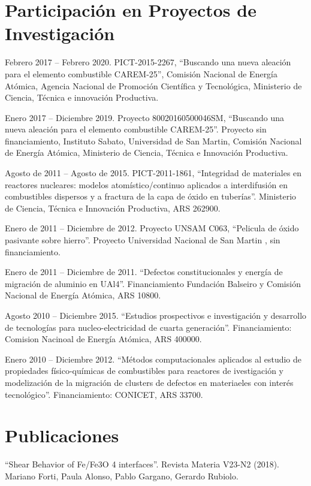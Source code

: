 \section{Participación en Proyectos de
Investigación}\label{participaciuxf3n-en-proyectos-de-investigaciuxf3n}

Febrero 2017 -- Febrero 2020. PICT-2015-2267, ``Buscando una nueva
aleación para el elemento combustible CAREM-25'', Comisión Nacional de
Energía Atómica, Agencia Nacional de Promoción Científica y Tecnológica,
Ministerio de Ciencia, Técnica e innovación Productiva.

Enero 2017 -- Diciembre 2019. Proyecto 80020160500046SM, ``Buscando una
nueva aleación para el elemento combustible CAREM-25''. Proyecto sin
financiamiento, Instituto Sabato, Universidad de San Martin, Comisión
Nacional de Energía Atómica, Ministerio de Ciencia, Técnica e Innovación
Productiva.

Agosto de 2011 -- Agosto de 2015. PICT-2011-1861, ``Integridad de
materiales en reactores nucleares: modelos atomístico/continuo aplicados
a interdifusión en combustibles dispersos y a fractura de la capa de
óxido en tuberías''. Ministerio de Ciencia, Técnica e Innovación
Productiva, ARS 262900.

Enero de 2011 -- Diciembre de 2012. Proyecto UNSAM C063, ``Pelicula de
óxido pasivante sobre hierro''. Proyecto Universidad Nacional de San
Martin , sin financiamiento.

Enero de 2011 -- Diciembre de 2011. ``Defectos constitucionales y
energía de migración de aluminio en UAl4''. Financiamiento Fundación
Balseiro y Comisión Nacional de Energía Atómica, ARS 10800.

Agosto 2010 -- Diciembre 2015. ``Estudios prospectivos e investigación y
desarrollo de tecnologías para nucleo-electricidad de cuarta
generación''. Financiamiento: Comision Nacinoal de Energía Atómica, ARS
400000.

Enero 2010 -- Diciembre 2012. ``Métodos computacionales aplicados al
estudio de propiedades físico-químicas de combustibles para reactores de
ivestigación y modelización de la migración de clusters de defectos en
materiaeles con interés tecnológico''. Financiamiento: CONICET, ARS
33700.

\section{Publicaciones}\label{publicaciones}

``Shear Behavior of Fe/Fe3O 4 interfaces''. Revista Materia V23-N2
(2018). Mariano Forti, Paula Alonso, Pablo Gargano, Gerardo Rubiolo.

